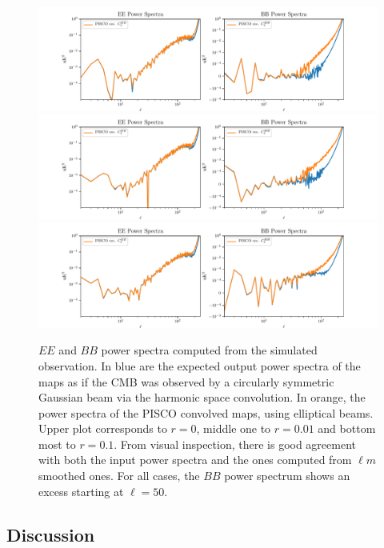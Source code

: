 \documentclass[a4paper,fleqn]{cas-dc}\sloppy
\begin{document}
	\begin{figure}
		\centering
		\includegraphics[width=1.0\linewidth]{figures/CLASS_scan_7_20_elliptical_gussian_beams_r_0d00.pdf}
		\includegraphics[width=1.0\linewidth]{figures/CLASS_scan_7_20_elliptical_gussian_beams_r_0d01.pdf}
		\includegraphics[width=1.0\linewidth]{figures/CLASS_scan_7_20_elliptical_gussian_beams_r_0d10.pdf}
		\caption{$EE$ and $BB$ power spectra computed from the simulated observation. In blue are the expected output power spectra of the maps as if the CMB was observed by a circularly symmetric Gaussian beam via the harmonic space convolution. In orange, the power spectra of the PISCO convolved maps, using elliptical beams. Upper plot corresponds to $r=0$, middle one to $r=0.01$ and bottom most to $r=0.1$. From visual inspection, there is good agreement with both the input power spectra and the ones computed from $\ell m$ smoothed ones. For all cases, the $BB$ power spectrum shows an excess starting at $\ell = 50$.}
		\label{fig::piscoclasssim}
	\end{figure}
	
	\subsection{Discussion}
	
\end{document}
